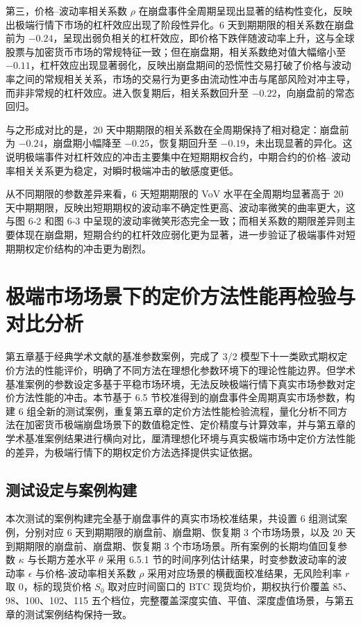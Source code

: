 第三，价格–波动率相关系数 $\rho$ 在崩盘事件全周期呈现出显著的结构性变化，反映出极端行情下市场的杠杆效应出现了阶段性异化。6 天到期期限的相关系数在崩盘前为 $-0.24$，呈现出弱负相关的杠杆效应，即价格下跌伴随波动率上升，这与全球股票与加密货币市场的常规特征一致；但在崩盘期，相关系数绝对值大幅缩小至 $-0.11$，杠杆效应出现显著弱化，反映出崩盘期间的恐慌性交易打破了价格与波动率之间的常规相关关系，市场的交易行为更多由流动性冲击与尾部风险对冲主导，而非非常规的杠杆效应。进入恢复期后，相关系数回升至 $-0.22$，向崩盘前的常态回归。

与之形成对比的是，20 天中期期限的相关系数在全周期保持了相对稳定：崩盘前为 $-0.24$，崩盘期小幅降至 $-0.25$，恢复期回升至 $-0.19$，未出现显著的异化。这说明极端事件对杠杆效应的冲击主要集中在短期期权合约，中期合约的价格–波动率相关关系更为稳定，对瞬时极端冲击的敏感度更低。

从不同期限的参数差异来看，6 天短期期限的 VoV 水平在全周期均显著高于 20 天中期期限，反映出短期期权的波动率不确定性更高、波动率微笑的曲率更大，这与图 6‑2 和图 6‑3 中呈现的波动率微笑形态完全一致；而相关系数的期限差异则主要体现在崩盘期，短期合约的杠杆效应弱化更为显著，进一步验证了极端事件对短期期权定价结构的冲击更为剧烈。

\section{极端市场场景下的定价方法性能再检验与对比分析}

第五章基于经典学术文献的基准参数案例，完成了 3/2 模型下十一类欧式期权定价方法的性能评价，明确了不同方法在理想化参数环境下的理论性能边界。但学术基准案例的参数设定多基于平稳市场环境，无法反映极端行情下真实市场参数对定价方法性能的冲击。本节基于 6.5 节校准得到的崩盘事件全周期真实市场参数，构建 6 组全新的测试案例，重复第五章的定价方法性能检验流程，量化分析不同方法在加密货币极端崩盘场景下的数值稳定性、定价精度与计算效率，并与第五章的学术基准案例结果进行横向对比，厘清理想化环境与真实极端市场中定价方法性能的差异，为极端行情下的期权定价方法选择提供实证依据。

\subsection{测试设定与案例构建}

本次测试的案例构建完全基于崩盘事件的真实市场校准结果，共设置 6 组测试案例，分别对应 6 天到期期限的崩盘前、崩盘期、恢复期 3 个市场场景，以及 20 天到期期限的崩盘前、崩盘期、恢复期 3 个市场场景。所有案例的长期均值回复参数 $\kappa$ 与长期方差水平 $\theta$ 采用 6.5.1 节的时间序列估计结果，时变参数波动率的波动率 $\epsilon$ 与价格-波动率相关系数 $\rho$ 采用对应场景的横截面校准结果，无风险利率 $r$ 取 0，标的现货价格 $S_0$ 取对应时间窗口的 BTC 现货均价，期权执行价覆盖 85、98、100、102、115 五个档位，完整覆盖深度实值、平值、深度虚值场景，与第五章的测试案例结构保持一致。

